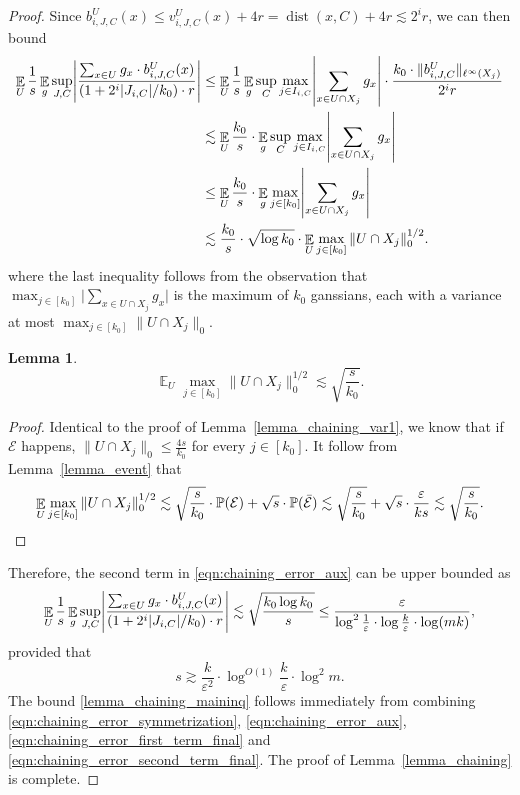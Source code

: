 \documentclass[11pt,letterpaper]{article}
\newtheorem{lemma}[theorem]{Lemma}
\theoremstyle{definition}
\newcommand{\eps}{\varepsilon}
\DeclareMathOperator*{\E}{\ensuremath{\mathbb{E}}}
\DeclareMathOperator{\dist}{dist}
\DeclarePairedDelimiter{\abs}{\lvert}{\rvert}
\DeclarePairedDelimiter{\norm}{\lVert}{\rVert}
\begin{document}
\begin{proof}
Since $b_{i,J,C}^U(x)\leq v_{i,J,C}^U(x)+4r=\dist(x,C)+4r\lesssim 2^i r$, we can then bound
\begin{equation}\label{eqn:chaining_error_second_term_semifinal}
\begin{aligned}
\E_U\frac{1}{s}\E_g \sup_{J,C} \abs*{ \frac{\sum_{x\in U} g_x \cdot b_{i,J,C}^U(x)}{(1+2^i|J_{i,C}|/k_0)\cdot r} } 
&\leq  \E_U\frac{1}{s}\E_g \sup_{C}\max_{j\in I_{i,C}} \abs*{ \sum_{x\in U\cap X_j} g_x 
}\cdot \frac{k_0\cdot \norm{b_{i,J,C}^U}_{\ell^\infty(X_j)}}{2^ir} \\
&\lesssim \E_U\frac{k_0}{s}\cdot \E_g \sup_{C}\max_{j\in I_{i,C}}  \abs*{ \sum_{x\in U\cap X_j} g_x }\\
&\leq   \E_U\frac{k_0}{s}\cdot \E_g \max_{j\in [k_0]}  \abs*{ \sum_{x\in U\cap X_j} g_x }\\
&\lesssim \frac{k_0}{s}\cdot \sqrt{\log k_0} \cdot \E_U \max_{j\in [k_0]} \|U\cap X_j\|^{1/2}_0.
\end{aligned}
\end{equation}
where the last inequality follows from the observation that  $\max_{j\in [k_0]} \big|\sum_{x\in U\cap X_j} g_x \big|$ is the maximum of $k_0$ ganssians, each with a variance at most $\max_{j\in [k_0]} \|U\cap X_j\|_0$.

\begin{lemma} \label{lemma_chaining_var2}
$$
\E_U \max_{j\in [k_0]} \|U\cap X_j\|^{1/2}_0\lesssim \sqrt{\frac{s}{k_0}}.
$$
\end{lemma}

\begin{proof}
Identical to the proof of Lemma~\ref{lemma_chaining_var1}, we know that if $\mathcal{E}$ happens,  $\|U\cap X_j\|_0\leq \frac{4s}{k_0}$ for every $j\in [k_0]$. It follow from Lemma~\ref{lemma_event} that
\[
\E_U \max_{j\in [k_0]} \|U\cap X_j\|^{1/2}_0
\lesssim \sqrt{\frac{s}{k_0}}\cdot\mathbb{P}(\mathcal{E}) + \sqrt{s}\cdot \mathbb{P}(\bar{\mathcal{E}})
\lesssim \sqrt{\frac{s}{k_0}} + \sqrt{s}
\cdot \frac{\eps}{ks}
\lesssim \sqrt{\frac{s}{k_0}}. \qedhere
\]
\end{proof}

Therefore, the second term in \eqref{eqn:chaining_error_aux} can be upper bounded as
\begin{equation}\label{eqn:chaining_error_second_term_final}
\E_U\frac{1}{s}\E_g \sup_{J,C} \abs*{ \frac{\sum_{x\in U} g_x \cdot b_{i,J,C}^U(x)}{(1+2^i|J_{i,C}|/k_0)\cdot r} }
\lesssim \sqrt{\frac{k_0\log k_0}{s}}
\leq \frac{\eps}{\log^2 \frac{1}{\eps}\cdot \log \frac{k}{\eps} \cdot \log (mk)},
\end{equation}
provided that 
\[
    s\gtrsim \frac{k}{\eps^2}\cdot \log^{O(1)} \frac{k}{\eps}\cdot \log^2 m.
\]
The bound \eqref{lemma_chaining_maininq} follows immediately from combining \eqref{eqn:chaining_error_symmetrization}, \eqref{eqn:chaining_error_aux}, \eqref{eqn:chaining_error_first_term_final} and \eqref{eqn:chaining_error_second_term_final}. The proof of Lemma~\ref{lemma_chaining} is complete.
\end{proof}
\end{document}

